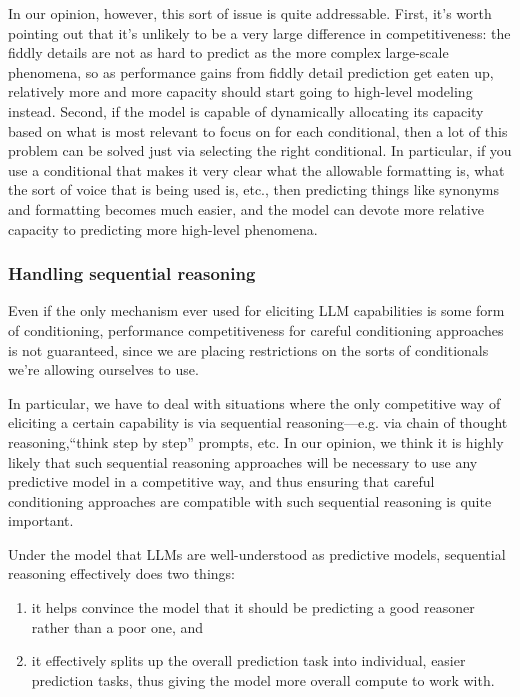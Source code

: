 \documentclass[
  twocolumn,
  natbib,
]{miri-tech-article}
\begin{document}
In our opinion, however, this sort of issue is quite addressable. First, it's worth pointing out that it's unlikely to be a very large difference in competitiveness: the fiddly details are not as hard to predict as the more complex large-scale phenomena, so as performance gains from fiddly detail prediction get eaten up, relatively more and more capacity should start going to high-level modeling instead. Second, if the model is capable of dynamically allocating its capacity based on what is most relevant to focus on for each conditional, then a lot of this problem can be solved just via selecting the right conditional. In particular, if you use a conditional that makes it very clear what the allowable formatting is, what the sort of voice that is being used is, etc., then predicting things like synonyms and formatting becomes much easier, and the model can devote more relative capacity to predicting more high-level phenomena.


\subsubsection{Handling sequential reasoning}\label{subsubsec:handling_sequential_reasoning}

Even if the only mechanism ever used for eliciting LLM capabilities is some form of conditioning, performance competitiveness for careful conditioning approaches is not guaranteed, since we are placing restrictions on the sorts of conditionals we're allowing ourselves to use.

In particular, we have to deal with situations where the only competitive way of eliciting a certain capability is via sequential reasoning---e.g. via chain of thought reasoning,``think step by step\cite{kojima_large_2023}'' prompts, etc. In our opinion, we think it is highly likely that such sequential reasoning approaches will be necessary to use any predictive model in a competitive way, and thus ensuring that careful conditioning approaches are compatible with such sequential reasoning is quite important.

Under the model that LLMs are well-understood as predictive models, sequential reasoning effectively does two things:



\begin{enumerate}
\item it helps convince the model that it should be predicting a good reasoner rather than a poor one, and
\item it effectively splits up the overall prediction task into individual, easier prediction tasks, thus giving the model more overall compute to work with.
\end{enumerate}
\end{document}
